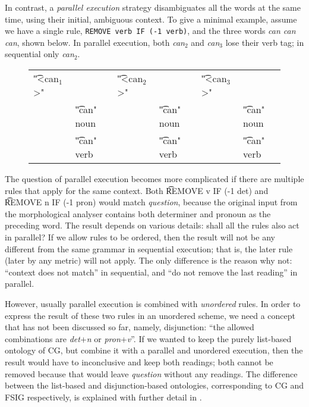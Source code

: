 In contrast, a \emph{parallel execution} strategy disambiguates all
the words at the same time, using their initial, ambiguous context.
To give a minimal example, assume we have a single rule,
\texttt{REMOVE verb IF (-1 verb)}, and the three words \emph{can can
  can}, shown below.  In parallel execution, both \emph{can$_2$} and
\emph{can$_3$} lose their verb tag; in sequential only \emph{can$_2$}.

\begin{figure}[h]
\begin{tabular}{p{0.5cm} l   p{0.5cm} l    p{0.5cm} l}
\t{"<can$_1$>"}      &  & \t{"<can$_2$>"}  & & \t{"<can$_3$>"} & \\
   & \t{"can" noun}  &  & \t{"can" noun} & & \t{"can" noun}   \\
   & \t{"can" verb}  &  & \t{"can" verb} & & \t{"can" verb} 

\end{tabular}
\end{figure}

The question of parallel execution becomes more complicated if there
are multiple rules that apply for the same context.  Both \t{REMOVE v
  IF (-1 det)} and \t{REMOVE n IF (-1 pron)} would match
\emph{question}, because the original input from the morphological
analyser contains both determiner and pronoun as the preceding word.
The result depends on various details: shall all the rules also act in
parallel?  If we allow rules to be ordered, then the result will not
be any different from the same grammar in sequential execution; that
is, the later rule (later by any metric) will not apply.  The only
difference is the reason why not: ``context does not match'' in
sequential, and ``do not remove the last reading'' in parallel.

However, usually parallel execution is combined with \emph{unordered}
rules.  In order to express the result of these two rules in an
unordered scheme, we need a concept that has not been discussed so
far, namely, disjunction: ``the allowed combinations are {\em
  det}+{\em n} or {\em pron}+{\em v}''.  If we wanted to keep the
purely list-based ontology of CG, but combine it with a parallel and
unordered execution, then the result would have to inconclusive and
keep both readings; both cannot be removed because that would leave
{\em question} without any readings.  The difference between the
list-based and disjunction-based ontologies, corresponding to CG and
FSIG respectively, is explained with further detail in
\cite{lager_nivre01}.

